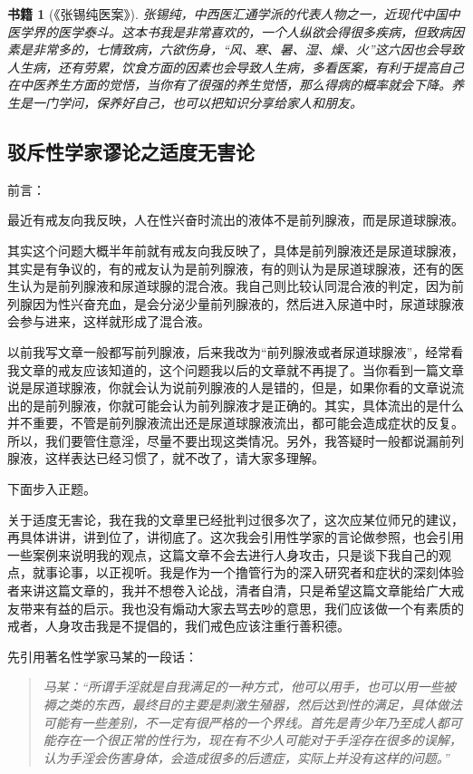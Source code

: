 \documentclass{ctexart}
\newtheorem{book}{书籍}
\begin{document}
\begin{book}[《张锡纯医案》]
    张锡纯，中西医汇通学派的代表人物之一，近现代中国中医学界的医学泰斗。这本书我是非常喜欢的，一个人纵欲会得很多疾病，但致病因素是非常多的，七情致病，六欲伤身，“风、寒、暑、湿、燥、火”这六因也会导致人生病，还有劳累，饮食方面的因素也会导致人生病，多看医案，有利于提高自己在中医养生方面的觉悟，当你有了很强的养生觉悟，那么得病的概率就会下降。养生是一门学问，保养好自己，也可以把知识分享给家人和朋友。
\end{book}

\subsection{驳斥性学家谬论之适度无害论}

前言：

最近有戒友向我反映，人在性兴奋时流出的液体不是前列腺液，而是尿道球腺液。

其实这个问题大概半年前就有戒友向我反映了，具体是前列腺液还是尿道球腺液，其实是有争议的，有的戒友认为是前列腺液，有的则认为是尿道球腺液，还有的医生认为是前列腺液和尿道球腺的混合液。我自己则比较认同混合液的判定，因为前列腺因为性兴奋充血，是会分泌少量前列腺液的，然后进入尿道中时，尿道球腺液会参与进来，这样就形成了混合液。

以前我写文章一般都写前列腺液，后来我改为“前列腺液或者尿道球腺液”，经常看我文章的戒友应该知道的，这个问题我以后的文章就不再提了。当你看到一篇文章说是尿道球腺液，你就会认为说前列腺液的人是错的，但是，如果你看的文章说流出的是前列腺液，你就可能会认为前列腺液才是正确的。其实，具体流出的是什么并不重要，不管是前列腺液流出还是尿道球腺液流出，都可能会造成症状的反复。所以，我们要管住意淫，尽量不要出现这类情况。另外，我答疑时一般都说漏前列腺液，这样表达已经习惯了，就不改了，请大家多理解。

下面步入正题。

关于适度无害论，我在我的文章里已经批判过很多次了，这次应某位师兄的建议，再具体讲讲，讲到位了，讲彻底了。这次我会引用性学家的言论做参照，也会引用一些案例来说明我的观点，这篇文章不会去进行人身攻击，只是谈下我自己的观点，就事论事，以正视听。我是作为一个撸管行为的深入研究者和症状的深刻体验者来讲这篇文章的，我并不想卷入论战，清者自清，只是希望这篇文章能给广大戒友带来有益的启示。我也没有煽动大家去骂去吵的意思，我们应该做一个有素质的戒者，人身攻击我是不提倡的，我们戒色应该注重行善积德。

先引用著名性学家马某的一段话：

\begin{quote}\it
    马某：“所谓手淫就是自我满足的一种方式，他可以用手，也可以用一些被褥之类的东西，最终目的主要是刺激生殖器，然后达到性的满足，具体做法可能有一些差别，不一定有很严格的一个界线。首先是青少年乃至成人都可能存在一个很正常的性行为，现在有不少人可能对于手淫存在很多的误解，认为手淫会伤害身体，会造成很多的后遗症，实际上并没有这样的问题。”
\end{quote}
\end{document}

